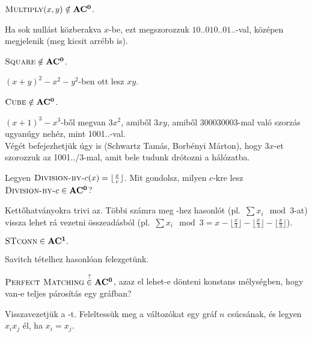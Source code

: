 \begin{Exercise}[counter={sorszam}, difficulty=0]
	$\mbox{\sc{Multiply}}(x,y)\notin\mbox{\ensuremath{\mathbf{AC^0}}}$.
\end{Exercise}
\begin{Answer}
	Ha sok null\'ast k\"ozberakva $x$-be, ezt megszorozzuk $10..010..01..$-val, k\"oz\'epen megjelenik  (meg kicsit arr\'ebb  is).
\end{Answer}

\begin{Exercise}[counter={sorszam}, difficulty=0]
	$\mbox{\sc{Square}}\notin\mbox{\ensuremath{\mathbf{AC^0}}}$.
\end{Exercise}
\begin{Answer}
	$(x+y)^2-x^2-y^2$-ben ott lesz $xy$.
\end{Answer}

\begin{Exercise}[counter={sorszam}, difficulty=0]
	$\mbox{\sc{Cube}}\notin\mbox{\ensuremath{\mathbf{AC^0}}}$.
\end{Exercise}
\begin{Answer}
	$(x+1)^3-x^3$-b\H ol megvan $3x^2$, amib\H ol $3xy$, amib\H ol 300030003-mal val\'o szorz\'as ugyan\'ugy neh\'ez, mint 1001..-val.\\
	V\'eg\'et befejezhetj\" uk \'ugy is (Schwartz Tam\'as, Borb\'enyi M\'arton), hogy $3x$-et szorozzuk az 1001../3-mal, amit bele tudunk dr\'otozni a h\'al\'ozatba.
\end{Answer}

\begin{Exercise}[counter={sorszam}, difficulty=0]
	Legyen $\mbox{\sc{Division-by-}} c(x)=\lfloor \frac xc\rfloor$.
	Mit gondolsz, milyen $c$-kre lesz $\mbox{\sc{Division-by-}} c\in\mbox{\ensuremath{\mathbf{AC^0}}}$?
\end{Exercise}
\begin{Answer}
	Kett\H ohatv\'anyokra trivi az. T\"obbi sz\'amra meg -hez hasonl\'ot (pl.\ $\sum x_i \mod 3$-at) vissza lehet r\'a vezetni \"osszead\'asb\'ol (pl.\ $\sum x_i \mod 3=x-\lfloor \frac x3\rfloor-\lfloor \frac x3\rfloor-\lfloor \frac x3\rfloor$).
\end{Answer}

\begin{Exercise}[counter={sorszam}, difficulty=0]
	$\mbox{\sc{STconn}} \in \mbox{\ensuremath{\mathbf{AC^1}}}.$
\end{Exercise}
\begin{Answer}
	Savitch t\'etelhez hasonl\'oan felezget\"unk.
\end{Answer}

\begin{Exercise}[counter={sorszam}, difficulty=0]
	$\mbox{\sc{Perfect Matching}} \stackrel ?\in \mbox{\ensuremath{\mathbf{AC^0}}}$, azaz el lehet-e d\"onteni konstans m\'elys\'egben, hogy van-e teljes p\'aros\'it\'as egy gr\'afban?
\end{Exercise}
\begin{Answer}
	Visszavezetj\"uk a -t. Feleltess\"uk meg a v\'altoz\'okat egy gr\'af $n$ cs\'ucs\'anak, \'es legyen $x_ix_j$ \'el, ha $x_i=x_j$.
\end{Answer}

